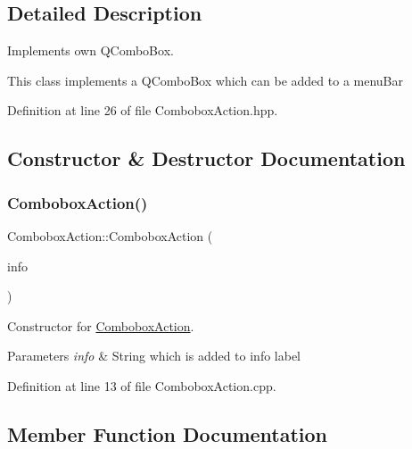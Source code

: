 \subsection{Detailed Description}
Implements own Q\+Combo\+Box. 

This class implements a Q\+Combo\+Box which can be added to a menu\+Bar 

Definition at line 26 of file Combobox\+Action.\+hpp.



\subsection{Constructor \& Destructor Documentation}
\mbox{\label{classComboboxAction_afa2a6bfade094a82beef7d478c5a4cf8}} 
\subsubsection{\texorpdfstring{Combobox\+Action()}{ComboboxAction()}}
{\footnotesize\ttfamily Combobox\+Action\+::\+Combobox\+Action (\begin{DoxyParamCaption}\item[{const Q\+String \&}]{info }\end{DoxyParamCaption})}



Constructor for \mbox{\hyperlink{classComboboxAction}{Combobox\+Action}}. 


\begin{DoxyParams}{Parameters}
{\em info} & String which is added to info label \\
\hline
\end{DoxyParams}


Definition at line 13 of file Combobox\+Action.\+cpp.



\subsection{Member Function Documentation}
\mbox{\label{classComboboxAction_a3472e15614e868dbf300fdbcbc5a011c}} 
